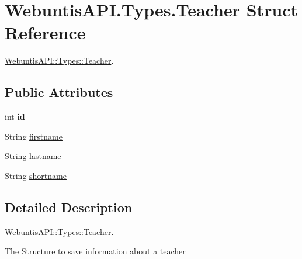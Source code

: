 \hypertarget{struct_webuntis_a_p_i_1_1_types_1_1_teacher}{\section{Webuntis\-A\-P\-I.\-Types.\-Teacher Struct Reference}
\label{struct_webuntis_a_p_i_1_1_types_1_1_teacher}
}


\hyperlink{struct_webuntis_a_p_i_1_1_types_1_1_teacher}{Webuntis\-A\-P\-I\-::\-Types\-::\-Teacher}.  


\subsection*{Public Attributes}
\begin{DoxyCompactItemize}
\item 
\hypertarget{struct_webuntis_a_p_i_1_1_types_1_1_teacher_a821dc00e09892946f7aa65066147b219}{int {\bfseries id}}\label{struct_webuntis_a_p_i_1_1_types_1_1_teacher_a821dc00e09892946f7aa65066147b219}

\item 
String \hyperlink{struct_webuntis_a_p_i_1_1_types_1_1_teacher_a60aa3278d7509fea3a5fd3e9d7e12e91}{firstname}
\item 
String \hyperlink{struct_webuntis_a_p_i_1_1_types_1_1_teacher_add1e2bb30e82e7ff0b14b3d497c44fcc}{lastname}
\item 
String \hyperlink{struct_webuntis_a_p_i_1_1_types_1_1_teacher_ad4fe004e4ae11294e487a92947f3ff41}{shortname}
\end{DoxyCompactItemize}


\subsection{Detailed Description}
\hyperlink{struct_webuntis_a_p_i_1_1_types_1_1_teacher}{Webuntis\-A\-P\-I\-::\-Types\-::\-Teacher}. 

The Structure to save information about a teacher 

